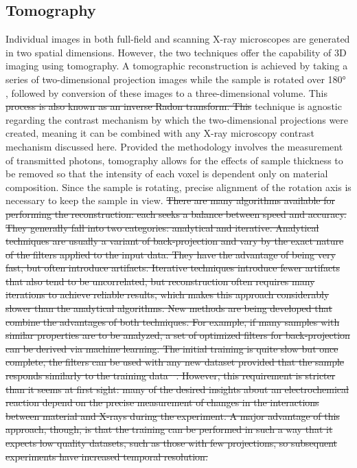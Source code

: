\documentclass[journal=cmatex,manuscript=perspective]{achemso}
\providecommand{\DIFaddtex}[1]{{\protect\color{blue}\uwave{#1}}} %
\providecommand{\DIFdeltex}[1]{{\protect\color{red}\sout{#1}}}                      %
\providecommand{\DIFaddbegin}{} %
\providecommand{\DIFaddend}{} %
\providecommand{\DIFdelbegin}{} %
\providecommand{\DIFdelend}{} %
\providecommand{\DIFadd}[1]{\texorpdfstring{\DIFaddtex{#1}}{#1}} %
\providecommand{\DIFdel}[1]{\texorpdfstring{\DIFdeltex{#1}}{}} %
\begin{document}
\subsection{Tomography}

Individual images in both full-field and scanning X-ray microscopes
are generated in two spatial dimensions. However, the two techniques
offer the capability of 3D imaging using tomography. A tomographic
reconstruction is achieved by taking a series of two-dimensional
projection images while the sample is rotated over \ang{180} \DIFaddbegin \DIFadd{(ideally)}\DIFaddend , followed
by conversion of these images to a three-dimensional volume. This \DIFdelbegin \DIFdel{process is also known as an inverse Radon transform. This }\DIFdelend technique is
agnostic regarding the contrast mechanism by which the two-dimensional
projections were created, meaning it can be combined with any X-ray
microscopy contrast mechanism discussed here. Provided the methodology
involves the measurement of transmitted photons, tomography allows for
the effects of sample thickness to be removed so that the intensity of
each voxel is dependent only on material composition. Since the sample
is rotating, precise alignment of the rotation axis is necessary to
keep the sample in view.
\DIFdelbegin \DIFdel{There are many algorithms available for
performing the reconstruction: each seeks a balance between speed and
accuracy. They generally fall into two categories: analytical and
iterative. Analytical techniques are usually a variant of
back-projection and vary by the exact nature of the filters applied to
the input data. They have the advantage of being very fast, but often
introduce artifacts. Iterative techniques introduce fewer artifacts
that also tend to be uncorrelated, but reconstruction often requires
many iterations to achieve reliable results, which makes this approach
considerably slower than the analytical algorithms. New methods are
being developed that combine the advantages of both techniques. For
example, if many samples with similar properties are to be analyzed, a
set of optimized filters for back-projection can be derived via
machine learning. The initial training is quite slow but once
complete, the filters can be used with any new dataset provided that
the sample responds similarly to the training
data\mbox{%
\cite{pelt2013}}%
. However, this requirement is stricter than it
seems at first sight: many of the desired insights about an
electrochemical reaction depend on the precise measurement of changes
in the interactions between material and X-rays during the
experiment. A major advantage of this approach, though, is that the
training can be performed in such a way that it expects low quality
datasets, such as those with few projections, so subsequent
experiments have increased temporal resolution.
}\DIFdelend 
\end{document}
